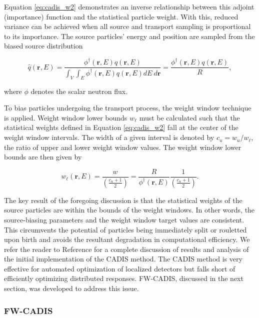 \documentclass{article} %
\newcommand{\vecr}{\textbf{r}}
\newcommand{\qhat}{\ensuremath{\hat{q}}}
\newcommand{\fwc}{\mbox{FW-CADIS}}
\begin{document}
\noindent Equation \ref{eq:cadis_w2} demonstrates an inverse relationship
between this adjoint (importance) function and the statistical particle weight.
With this, reduced variance can be achieved when all source and transport
sampling is proportional to its importance. The source particles' energy and
position are sampled from the biased source distribution

\begin{equation}
\qhat(\vecr,E) = 
\frac{\phi^{\dagger}(\vecr,E)q(\vecr,E)}
{\int_V\int_E\phi^{\dagger}(\vecr,E)q(\vecr,E) dE\ d\vecr} 
= \frac{\phi^{\dagger}(\vecr,E)q(\vecr,E)}{R},
\label{eq:cadis_sb}
\end{equation}

\noindent where $\phi$ denotes the scalar neutron flux.

To bias particles undergoing the transport process, the weight window technique
is applied. Weight window lower bounds $w_{\ell}$ must be calculated such that
the statistical weights defined in Equation \ref{eq:cadis_w2} fall at the
center of the weight window intervals. The width of a given interval is denoted
by $c_u = w_u/w_{\ell}$, the ratio of upper and lower weight window values. The
weight window lower bounds are then given by

\begin{equation}
w_{\ell}(\vecr,E) = \frac{w}{\left(\frac{c_u +1}{2}\right)} 
= \frac{R}{\phi^{\dagger}(\vecr,E)}\frac{1}{\left(\frac{c_u +1}{2}\right)}.
\label{eq:cadis_tb}
\end{equation}

The key result of the foregoing discussion is that the statistical weights of
the source particles are within the bounds of the weight windows. In other
words, the source-biasing parameters and the weight window target values are
consistent. This circumvents the potential of particles being immediately split
or rouletted upon birth and avoids the resultant degradation in computational
efficiency. We refer the reader to Reference \cite{cadis} for a complete
discussion of results and analysis of the initial implementation of the CADIS
method. The CADIS method is very effective for automated optimization of
localized detectors but falls short of efficiently optimizing distributed
responses. \fwc, discussed in the next section, was developed to address this
issue.

\subsubsection{\fwc}
\end{document}
